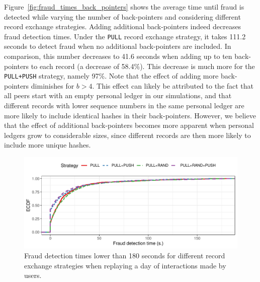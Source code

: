 Figure~\ref{fig:fraud_times_back_pointers} shows the average time until fraud is detected while varying the number of back-pointers and considering different record exchange strategies.
Adding additional back-pointers indeed decreases fraud detection times.
Under the \texttt{PULL} record exchange strategy, it takes 111.2 seconds to detect fraud when no additional back-pointers are included. In comparison, this number decreases to 41.6 seconds when adding up to ten back-pointers to each record (a decrease of 58.4\%).
This decrease is much more for the \texttt{PULL+PUSH} strategy, namely 97\%.
Note that the effect of adding more back-pointers diminishes for $ b > 4 $.
This effect can likely be attributed to the fact that all peers start with an empty personal ledger in our simulations, and that different records with lower sequence numbers in the same personal ledger are more likely to include identical hashes in their back-pointers.
However, we believe that the effect of additional back-pointers becomes more apparent when personal ledgers grow to considerable sizes, since different records are then more likely to include more unique hashes.

\begin{figure}[t]
	\centering
	\includegraphics[width=\linewidth]{trustchain/assets/fraud_experiment_realistic_ecdf}
	\caption{Fraud detection times lower than 180 seconds for different record exchange strategies when replaying a day of interactions made by \Tribler{} users.}
	\label{fig:fraud_times_realistic_dataset}
\end{figure}

